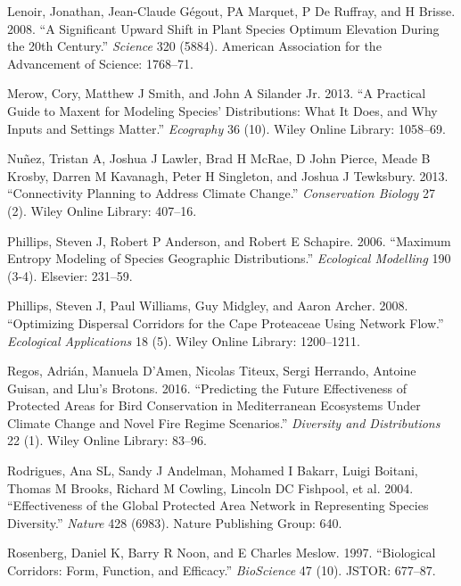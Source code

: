 \documentclass[]{article}
\begin{document}
\leavevmode\hypertarget{ref-lenoir2008significant}{}%
Lenoir, Jonathan, Jean-Claude Gégout, PA Marquet, P De Ruffray, and H Brisse. 2008. ``A Significant Upward Shift in Plant Species Optimum Elevation During the 20th Century.'' \emph{Science} 320 (5884). American Association for the Advancement of Science: 1768--71.

\leavevmode\hypertarget{ref-merow2013practical}{}%
Merow, Cory, Matthew J Smith, and John A Silander Jr. 2013. ``A Practical Guide to Maxent for Modeling Species' Distributions: What It Does, and Why Inputs and Settings Matter.'' \emph{Ecography} 36 (10). Wiley Online Library: 1058--69.

\leavevmode\hypertarget{ref-nunez2013connectivity}{}%
Nuñez, Tristan A, Joshua J Lawler, Brad H McRae, D John Pierce, Meade B Krosby, Darren M Kavanagh, Peter H Singleton, and Joshua J Tewksbury. 2013. ``Connectivity Planning to Address Climate Change.'' \emph{Conservation Biology} 27 (2). Wiley Online Library: 407--16.

\leavevmode\hypertarget{ref-phillips2006maximum}{}%
Phillips, Steven J, Robert P Anderson, and Robert E Schapire. 2006. ``Maximum Entropy Modeling of Species Geographic Distributions.'' \emph{Ecological Modelling} 190 (3-4). Elsevier: 231--59.

\leavevmode\hypertarget{ref-phillips2008optimizing}{}%
Phillips, Steven J, Paul Williams, Guy Midgley, and Aaron Archer. 2008. ``Optimizing Dispersal Corridors for the Cape Proteaceae Using Network Flow.'' \emph{Ecological Applications} 18 (5). Wiley Online Library: 1200--1211.

\leavevmode\hypertarget{ref-regos2016predicting}{}%
Regos, Adrián, Manuela D'Amen, Nicolas Titeux, Sergi Herrando, Antoine Guisan, and Lluı's Brotons. 2016. ``Predicting the Future Effectiveness of Protected Areas for Bird Conservation in Mediterranean Ecosystems Under Climate Change and Novel Fire Regime Scenarios.'' \emph{Diversity and Distributions} 22 (1). Wiley Online Library: 83--96.

\leavevmode\hypertarget{ref-rodrigues2004effectiveness}{}%
Rodrigues, Ana SL, Sandy J Andelman, Mohamed I Bakarr, Luigi Boitani, Thomas M Brooks, Richard M Cowling, Lincoln DC Fishpool, et al. 2004. ``Effectiveness of the Global Protected Area Network in Representing Species Diversity.'' \emph{Nature} 428 (6983). Nature Publishing Group: 640.

\leavevmode\hypertarget{ref-rosenberg1997biological}{}%
Rosenberg, Daniel K, Barry R Noon, and E Charles Meslow. 1997. ``Biological Corridors: Form, Function, and Efficacy.'' \emph{BioScience} 47 (10). JSTOR: 677--87.
\end{document}
